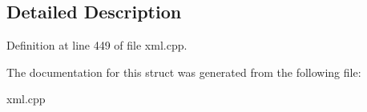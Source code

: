 \subsection{Detailed Description}


Definition at line 449 of file xml.cpp.



The documentation for this struct was generated from the following file:\begin{DoxyCompactItemize}
\item 
xml.cpp\end{DoxyCompactItemize}

